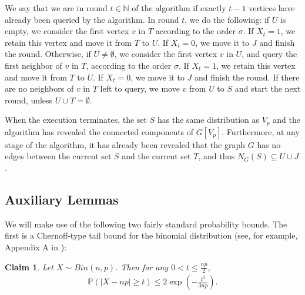 \documentclass[notitlepage]{scrartcl}
\newtheorem{claim}[thm]{Claim}
\begin{document}
We say that we are in round $t\in \mathbb{N}$ of the algorithm if exactly $t-1$ vertices have already been queried by the algorithm. In round $t$, we do the following: if $U$ is empty, we consider the first vertex $v$ in $T$ according to the order $\sigma$. If $X_t = 1$, we retain this vertex and move it from $T$ to $U$. If $X_t = 0$, we move it to $J$ and finish the round. Otherwise, if $U\neq \emptyset$, we consider the first vertex $v$ in $U$, and query the first neighbor of $v$ in $T$, according to the order $\sigma$. If $X_t = 1$, we retain this vertex and move it from $T$ to $U$. If $X_t = 0$, we move it to $J$ and finish the round. If there are no neighbors of $v$ in $T$ left to query, we move $v$ from $U$ to $S$ and start the next round, unless $U\cup T=\emptyset$.

When the execution terminates, the set $S$ has the same distribution as $V_p$ and the algorithm has revealed the connected components of $G[V_p]$. Furthermore, at any stage of the algorithm, it has already been revealed that the graph $G$ has no edges between the current set $S$ and the current set $T$, and thus $N_G(S) \subseteq U \cup J$.

\subsection{Auxiliary Lemmas}

We will make use of the following two fairly standard probability bounds. The first is a Chernoff-type tail bound for the binomial distribution (see, for example, Appendix A in \cite{zbMATH06566409}):
\begin{claim} \label{cher}
    Let $X\sim Bin(n,p)$. Then for any $0<t\leq \frac{np}{2}$,
    \begin{align*}
        \mathbb{P}(|X-np|\geq t)\leq 2\exp \left(-\frac{t^2}{3np}\right).
    \end{align*}
\end{claim}
\end{document}
